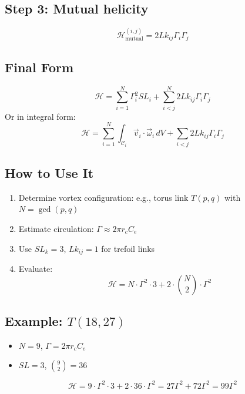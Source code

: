 \documentclass[a4paper,12pt]{article}
\begin{document}
    \subsection*{Step 3: Mutual helicity}
    \begin{equation}
        \mathcal{H}_{\text{mutual}}^{(i,j)} = 2 Lk_{ij} \Gamma_i \Gamma_j
    \end{equation}

    \subsection*{Final Form}
    \begin{equation}
        \boxed{
            \mathcal{H} = \sum_{i=1}^{N} \Gamma_i^2 SL_i + \sum_{i < j}^{N} 2 Lk_{ij} \Gamma_i \Gamma_j
        }
    \end{equation}
    Or in integral form:
    \begin{equation}
        \boxed{
            \mathcal{H} = \sum_{i=1}^{N} \int_{\mathcal{C}_i} \vec{v}_i \cdot \vec{\omega}_i \, dV + \sum_{i < j} 2 Lk_{ij} \Gamma_i \Gamma_j
        }
    \end{equation}

    \subsection{ How to Use It}
    \begin{enumerate}
        \item Determine vortex configuration: e.g., torus link $T(p,q)$ with $N = \gcd(p,q)$
        \item Estimate circulation: $\Gamma \approx 2\pi r_c C_e$
        \item Use $SL_k = 3$, $Lk_{ij} = 1$ for trefoil links
        \item Evaluate:
        \[ \mathcal{H} = N \cdot \Gamma^2 \cdot 3 + 2 \cdot \binom{N}{2} \cdot \Gamma^2 \]
    \end{enumerate}

    \subsection*{ Example: $T(18,27)$}
    \begin{itemize}
        \item $N = 9$, $\Gamma = 2\pi r_c C_e$
        \item $SL = 3$, $\binom{9}{2} = 36$
    \end{itemize}
    \begin{equation}
        \mathcal{H} = 9 \cdot \Gamma^2 \cdot 3 + 2 \cdot 36 \cdot \Gamma^2 = 27\Gamma^2 + 72\Gamma^2 = 99\Gamma^2
    \end{equation}
\end{document}
